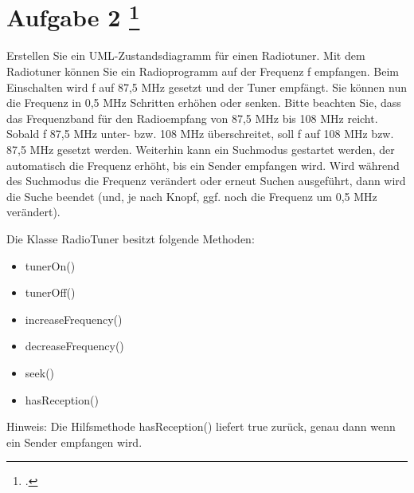 \documentclass{lehramt-informatik-aufgabe}
\begin{document}
\section{Aufgabe 2
\footcite{examen:66116:2015:03}}

Erstellen Sie ein UML-Zustandsdiagramm für einen Radiotuner. Mit dem
Radiotuner können Sie ein Radioprogramm auf der Frequenz f empfangen.
Beim Einschalten wird f auf 87,5 MHz gesetzt und der Tuner empfängt. Sie
können nun die Frequenz in 0,5 MHz Schritten erhöhen oder senken. Bitte
beachten Sie, dass das Frequenzband für den Radioempfang von 87,5
MHz bis 108 MHz reicht. Sobald f 87,5 MHz unter- bzw. 108 MHz
überschreitet, soll f auf 108 MHz bzw. 87,5 MHz gesetzt werden. Weiterhin
kann ein Suchmodus gestartet werden, der automatisch die Frequenz
erhöht, bis ein Sender empfangen wird. Wird während des Suchmodus die
Frequenz verändert oder erneut Suchen ausgeführt, dann wird die Suche
beendet (und, je nach Knopf, ggf. noch die Frequenz um 0,5 MHz
verändert).

\noindent
Die Klasse RadioTuner besitzt folgende Methoden:

\begin{itemize}
\item tunerOn()
\item tunerOff()
\item increaseFrequency()
\item decreaseFrequency()
\item seek()
\item hasReception()
\end{itemize}

\noindent
Hinweis: Die Hilfsmethode hasReception() liefert true zurück, genau dann
wenn ein Sender empfangen wird.

\end{document}
